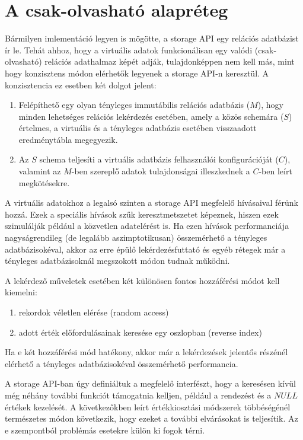 \documentclass[
    parspace, %
    noindent, %
]{elteiktdk}[2023/10/30]
\begin{document}

\section{A csak-olvasható alapréteg}

Bármilyen imlementáció legyen is mögötte, a storage API egy relációs adatbázist ír le.
Tehát ahhoz, hogy a virtuális adatok funkcionálisan egy valódi (csak-olvasható) relációs adathalmaz képét adják,
tulajdonképpen nem kell más, mint hogy konzisztens módon elérhetők legyenek a storage API-n keresztül.
A konzisztencia ez esetben két dolgot jelent:

\begin{enumerate}
  \item Felépíthető egy olyan tényleges immutábilis relációs adatbázis ($M$),
        hogy minden lehetséges relációs lekérdezés esetében, amely a közös schemára ($S$) értelmes,
        a virtuális és a tényleges adatbázis esetében visszaadott eredménytábla megegyezik.
  \item Az $S$ schema teljesíti a virtuális adatbázis felhasználói konfigurációját ($C$),
        valamint az $M$-ben szereplő adatok tulajdonságai illeszkednek a $C$-ben leírt megkötésekre.
\end{enumerate}

A virtuális adatokhoz a legalsó szinten a storage API megfelelő hívásaival férünk hozzá.
Ezek a speciális hívások szűk keresztmetszetet képeznek,
hiszen ezek szimulálják például a közvetlen adatelérést is.
Ha ezen hívások performanciája nagyságrendileg (de legalább aszimptotikusan) összemérhető a tényleges adatbázisokéval,
akkor az erre épülő lekérdezésfuttató és egyéb rétegek már a tényleges adatbázisoknál megszokott módon tudnak működni.

A lekérdező műveletek esetében két különösen fontos hozzáférési módot kell kiemelni:

\begin{enumerate}
  \item rekordok véletlen elérése (random access)
  \item adott érték előfordulásainak keresése egy oszlopban (reverse index)
\end{enumerate}

Ha e két hozzáférési mód hatékony, akkor már a lekérdezések jelentős részénél
elérhető a tényleges adatbázisokéval összemérhető performancia.

A storage API-ban úgy definiáltuk a megfelelő interfészt,
hogy a keresésen kívül még néhány további funkciót támogatnia kelljen,
például a rendezést és a $NULL$ értékek kezelését.
A következőkben leírt értékkiosztási módszerek többéségénél természetes módon következik,
hogy ezeket a további elvárásokat is teljesítik.
Az e szempontból problémás esetekre külön ki fogok térni.
\end{document}
